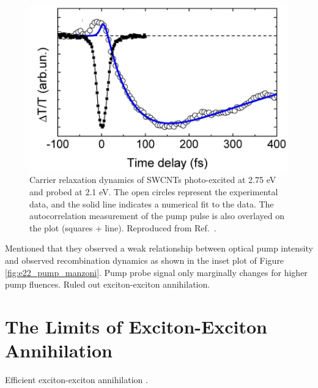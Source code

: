 \begin{figure}[ht]
	\centering
	\includegraphics[scale=1.3]{images/chapter_prior_works/e33_pump_e22_probe_manzoni}
	\caption{Carrier relaxation dynamics of SWCNTs photo-excited at 2.75 eV and probed at 2.1 eV. The open circles represent the experimental data, and the solid line indicates a numerical fit to the data. The autocorrelation measurement of the pump pulse is also overlayed on the plot (squares + line). Reproduced from Ref.\ \cite{manzoni2005intersubband}.}
	\label{fig:e33_pump_manzoni}
\end{figure}


Mentioned that they observed a weak relationship between optical pump intensity and observed recombination dynamics as shown in the inset plot of  Figure \ref{fig:e22_pump_manzoni}. Pump probe signal only marginally changes for higher pump fluences. Ruled out exciton-exciton annihilation. 



\cite{manzoni2005intersubband}
\section{The Limits of Exciton-Exciton Annihilation}

Efficient exciton-exciton annihilation \cite{murakami2009existence}.

